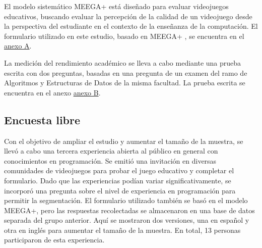 El modelo sistemático MEEGA+ \cite{meegaplus} está diseñado para evaluar videojuegos educativos, buscando evaluar la percepción de la calidad de un videojuego desde la perspectiva del estudiante en el contexto de la enseñanza de la computación. El formulario utilizado en este estudio, basado en MEEGA+ \cite{meegaplus}, se encuentra en el \hyperref[AnexoA]{anexo A}.

La medición del rendimiento académico se lleva a cabo mediante una prueba escrita con dos preguntas, basadas en una pregunta de un examen del ramo de Algoritmos y Estructuras de Datos de la misma facultad. La prueba escrita se encuentra en el anexo \hyperref[AnexoB]{anexo B}.


\subsection{Encuesta libre}


Con el objetivo de ampliar el estudio y aumentar el tamaño de la muestra, se llevó a cabo una tercera experiencia abierta al público en general con conocimientos en programación. Se emitió una invitación en diversas comunidades de videojuegos para probar el juego educativo y completar el formulario. Dado que las experiencias podían variar significativamente, se incorporó una pregunta sobre el nivel de experiencia en programación para permitir la segmentación. El formulario utilizado también se basó en el modelo MEEGA+, pero las respuestas recolectadas se almacenaron en una base de datos separada del grupo anterior. Aquí se mostraron dos versiones, una en español y otra en inglés para aumentar el tamaño de la muestra. En total, 13 personas participaron de esta experiencia.